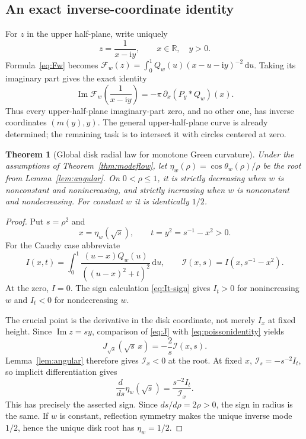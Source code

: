 \documentclass[11pt]{article}
\numberwithin{equation}{section}
\newtheorem{theorem}{Theorem}[section]
\theoremstyle{definition}
\theoremstyle{remark}
\DeclareMathOperator{\Imn}{Im}
\newcommand{\dd}{\,\mathrm d}
\newcommand{\ii}{\mathrm i}
\newcommand{\R}{\mathbb R}
\newcommand{\Qw}{Q_w}
\begin{document}
\subsection{An exact inverse-coordinate identity}
For $z$ in the upper half-plane, write uniquely
\begin{equation}\label{eq:inverse}
 z=\frac1{x-\ii y},\qquad x\in\R,\quad y>0.
\end{equation}
Formula~\eqref{eq:Fw} becomes
$\mathcal F_w(z)=\int_0^1\Qw(u)(x-u-\ii y)^{-2}\dd u$.
Taking its imaginary part gives the exact identity
\begin{equation}\label{eq:poissonidentity}
 \Imn\mathcal F_w\!\left(\frac1{x-\ii y}\right)
       =-\pi\,\partial_x(P_y*\Qw)(x).
\end{equation}
Thus every upper-half-plane imaginary-part zero, and no other one,
has inverse coordinates $(m(y),y)$. The general upper-half-plane
curve is already determined; the remaining task is to intersect it
with circles centered at zero.

\begin{theorem}[Global disk radial law for monotone Green curvature]
\label{thm:generalradial}
Under the assumptions of Theorem~\ref{thm:modeflow}, let
$\eta_w(\rho)=\cos\theta_w(\rho)/\rho$ be the root from
Lemma~\ref{lem:angular}. On $0<\rho\le1$, it is strictly decreasing
when $w$ is nonconstant and nonincreasing, and strictly increasing
when $w$ is nonconstant and nondecreasing. For constant $w$ it is
identically $1/2$.
\end{theorem}
\begin{proof}
Put $s=\rho^2$ and
\begin{equation}\label{eq:radialcoordinates}
 x=\eta_w(\sqrt s),\qquad
 t=y^2=s^{-1}-x^2>0.
\end{equation}
For the Cauchy case abbreviate
\[
 I(x,t)=\int_0^1\frac{(u-x)\Qw(u)}{((u-x)^2+t)^2}\dd u,
 \qquad \mathcal I(x,s)=I(x,s^{-1}-x^2).
\]
At the zero, $I=0$. The sign calculation \eqref{eq:It-sign} gives
$I_t>0$ for nonincreasing $w$ and $I_t<0$ for nondecreasing $w$.

The crucial point is the derivative in the disk coordinate, not merely
$I_x$ at fixed height. Since $\Imn z=sy$, comparison of
\eqref{eq:J} with \eqref{eq:poissonidentity} yields
\begin{equation}\label{eq:JI}
 J_{\sqrt s}(\sqrt s\,x)=-\frac2s\mathcal I(x,s).
\end{equation}
Lemma~\ref{lem:angular} therefore gives
$\mathcal I_x<0$ at the root. At fixed $x$,
$\mathcal I_s=-s^{-2}I_t$, so implicit differentiation gives
\begin{equation}\label{eq:etasderivative}
 \frac d{ds}\eta_w(\sqrt s)
          =\frac{s^{-2}I_t}{\mathcal I_x}.
\end{equation}
This has precisely the asserted sign. Since $d s/d\rho=2\rho>0$,
the sign in radius is the same. If $w$ is constant, reflection
symmetry makes the unique inverse mode $1/2$, hence the unique disk
root has $\eta_w=1/2$.
\end{proof}
\end{document}
